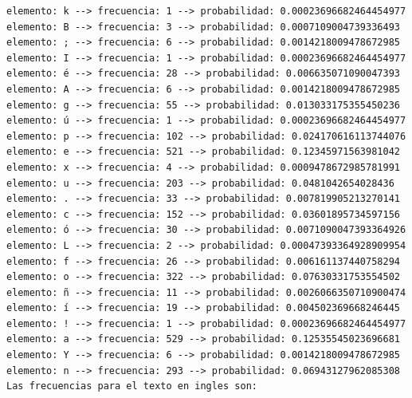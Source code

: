 \documentclass[10pt]{article}
\begin{document}
\begin{verbatim}
elemento: k --> frecuencia: 1 --> probabilidad: 0.00023696682464454977
elemento: B --> frecuencia: 3 --> probabilidad: 0.0007109004739336493
elemento: ; --> frecuencia: 6 --> probabilidad: 0.0014218009478672985
elemento: I --> frecuencia: 1 --> probabilidad: 0.00023696682464454977
elemento: é --> frecuencia: 28 --> probabilidad: 0.006635071090047393
elemento: A --> frecuencia: 6 --> probabilidad: 0.0014218009478672985
elemento: g --> frecuencia: 55 --> probabilidad: 0.013033175355450236
elemento: ú --> frecuencia: 1 --> probabilidad: 0.00023696682464454977
elemento: p --> frecuencia: 102 --> probabilidad: 0.024170616113744076
elemento: e --> frecuencia: 521 --> probabilidad: 0.12345971563981042
elemento: x --> frecuencia: 4 --> probabilidad: 0.0009478672985781991
elemento: u --> frecuencia: 203 --> probabilidad: 0.0481042654028436
elemento: . --> frecuencia: 33 --> probabilidad: 0.007819905213270141
elemento: c --> frecuencia: 152 --> probabilidad: 0.03601895734597156
elemento: ó --> frecuencia: 30 --> probabilidad: 0.0071090047393364926
elemento: L --> frecuencia: 2 --> probabilidad: 0.00047393364928909954
elemento: f --> frecuencia: 26 --> probabilidad: 0.006161137440758294
elemento: o --> frecuencia: 322 --> probabilidad: 0.07630331753554502
elemento: ñ --> frecuencia: 11 --> probabilidad: 0.0026066350710900474
elemento: í --> frecuencia: 19 --> probabilidad: 0.004502369668246445
elemento: ! --> frecuencia: 1 --> probabilidad: 0.00023696682464454977
elemento: a --> frecuencia: 529 --> probabilidad: 0.12535545023696681
elemento: Y --> frecuencia: 6 --> probabilidad: 0.0014218009478672985
elemento: n --> frecuencia: 293 --> probabilidad: 0.06943127962085308
Las frecuencias para el texto en ingles son:



\end{verbatim}
\end{document}

